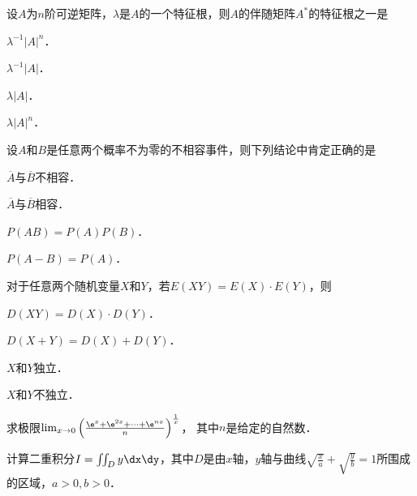 \documentclass[plain,noanswer,medmath]{../../template/jnuexam}
\begin{document}
\begin{problem}
设$A$为$n$阶可逆矩阵，$\lambda$是$A$的一个特征根，则$A$的伴随矩阵$A^*$的特征根之一是\pickout{}
\begin{abcd}
\item $\lambda^{-1}|A|^n$．
\item $\lambda^{-1}|A|$．
\item $\lambda |A|$．
\item $\lambda |A|^n$．
\end{abcd}
\end{problem}


\begin{problem}
设$A$和$B$是任意两个概率不为零的不相容事件，则下列结论中肯定正确的是 \pickout{}
\begin{abcd}
\item $\overline{A}$与$\overline{B}$不相容．						
\item $\overline{A}$与$\overline{B}$相容．
\item $P(AB) = P(A)P(B)$．
\item $P(A - B) = P(A)$．
\end{abcd}
\end{problem}


\begin{problem}
对于任意两个随机变量$X$和$Y$，若$E(XY) = E(X) \cdot E(Y)$，则\pickout{}
\begin{abcd}
\item $D(XY) = D(X) \cdot D(Y)$．				
\item $D(X + Y) = D(X) + D(Y)$．
\item $X$和$Y$独立．						
\item $X$和$Y$不独立．
\end{abcd}
\end{problem}



\begin{problem}
求极限$\lim_{x \to 0} \left(\frac{\e^x + \e^{2x} + \cdots + \e^{nx}}{n} \right)^{\frac{1}{x}}$，
其中$n$是给定的自然数．
\end{problem}



\begin{problem}
计算二重积分$I = \iint_D y\dx\dy$，其中$D$是由$x$轴，$y$轴与曲线$\sqrt{\frac{x}{a}} + \sqrt{\frac{y}{b}} = 1$所围成的区域，$a > 0,b > 0$．
\end{problem}


\end{document}

